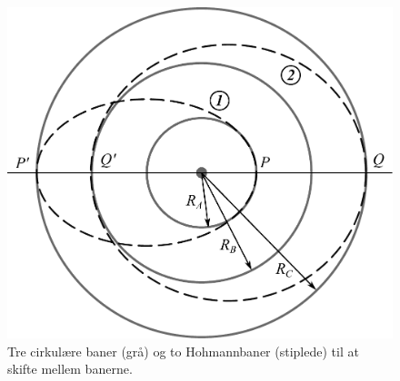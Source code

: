 \begin{figure}[h!]
	\centering
	\includegraphics[width=\columnwidth]{Planetbevaegelse/Hohmann2.pdf}
	\caption{Tre cirkulære baner (grå) og to Hohmannbaner (stiplede) til at skifte mellem banerne.}
	\label{fig:Hohmann2}
\end{figure}